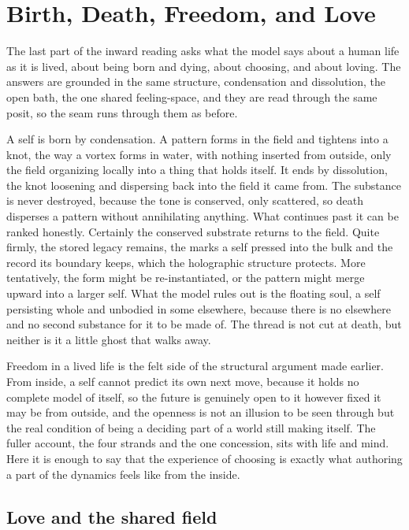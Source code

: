 \section{Birth, Death, Freedom, and Love}

The last part of the inward reading asks what the model says about a human life as it is lived, about being born and dying, about choosing, and about loving. The answers are grounded in the same structure, condensation and dissolution, the open bath, the one shared feeling-space, and they are read through the same posit, so the seam runs through them as before.

A self is born by condensation. A pattern forms in the field and tightens into a knot, the way a vortex forms in water, with nothing inserted from outside, only the field organizing locally into a thing that holds itself. It ends by dissolution, the knot loosening and dispersing back into the field it came from. The substance is never destroyed, because the tone is conserved, only scattered, so death disperses a pattern without annihilating anything. What continues past it can be ranked honestly. Certainly the conserved substrate returns to the field. Quite firmly, the stored legacy remains, the marks a self pressed into the bulk and the record its boundary keeps, which the holographic structure protects. More tentatively, the form might be re-instantiated, or the pattern might merge upward into a larger self. What the model rules out is the floating soul, a self persisting whole and unbodied in some elsewhere, because there is no elsewhere and no second substance for it to be made of. The thread is not cut at death, but neither is it a little ghost that walks away.

Freedom in a lived life is the felt side of the structural argument made earlier. From inside, a self cannot predict its own next move, because it holds no complete model of itself, so the future is genuinely open to it however fixed it may be from outside, and the openness is not an illusion to be seen through but the real condition of being a deciding part of a world still making itself. The fuller account, the four strands and the one concession, sits with life and mind. Here it is enough to say that the experience of choosing is exactly what authoring a part of the dynamics feels like from the inside.

\subsection{Love and the shared field}

